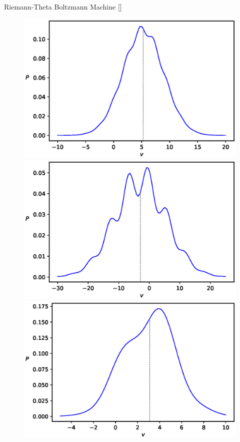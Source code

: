 \documentclass[10pt]{beamer}
\begin{document}
\begin{frame}{Riemann-Theta Boltzmann Machine \hfill \small [\cite{2020}]}
    \begin{figure}
        \begin{center}
          \includegraphics[scale=0.25]{figures/PvPhaseI-1}
          \includegraphics[scale=0.25]{figures/PvPhaseI-2}
          \includegraphics[scale=0.25]{figures/PvPhaseI-3}

\end{center}
\end{figure}
\end{frame}
\end{document}
